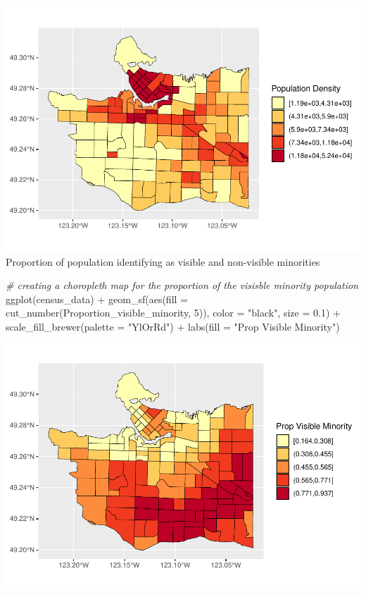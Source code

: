 \documentclass[
]{article}
\newenvironment{Shaded}{\begin{snugshade}}{\end{snugshade}}
\newcommand{\AttributeTok}[1]{\textcolor[rgb]{0.77,0.63,0.00}{#1}}
\newcommand{\CommentTok}[1]{\textcolor[rgb]{0.56,0.35,0.01}{\textit{#1}}}
\newcommand{\DecValTok}[1]{\textcolor[rgb]{0.00,0.00,0.81}{#1}}
\newcommand{\FloatTok}[1]{\textcolor[rgb]{0.00,0.00,0.81}{#1}}
\newcommand{\FunctionTok}[1]{\textcolor[rgb]{0.00,0.00,0.00}{#1}}
\newcommand{\NormalTok}[1]{#1}
\newcommand{\SpecialCharTok}[1]{\textcolor[rgb]{0.00,0.00,0.00}{#1}}
\newcommand{\StringTok}[1]{\textcolor[rgb]{0.31,0.60,0.02}{#1}}
\begin{document}
\includegraphics{4GA3Markdown_files/figure-latex/unnamed-chunk-23-1.pdf}
Proportion of population identifying as visible and non-visible
minorities

\begin{Shaded}
\begin{Highlighting}[]
\CommentTok{\# creating a choropleth map for the proportion of the visisble minority population}
\FunctionTok{ggplot}\NormalTok{(census\_data) }\SpecialCharTok{+}
\FunctionTok{geom\_sf}\NormalTok{(}\FunctionTok{aes}\NormalTok{(}\AttributeTok{fill =} \FunctionTok{cut\_number}\NormalTok{(Proportion\_visible\_minority, }\DecValTok{5}\NormalTok{)),}
        \AttributeTok{color =} \StringTok{"black"}\NormalTok{,}
        \AttributeTok{size =} \FloatTok{0.1}\NormalTok{) }\SpecialCharTok{+}
\FunctionTok{scale\_fill\_brewer}\NormalTok{(}\AttributeTok{palette =} \StringTok{"YlOrRd"}\NormalTok{) }\SpecialCharTok{+}
\FunctionTok{labs}\NormalTok{(}\AttributeTok{fill =} \StringTok{"Prop Visible Minority"}\NormalTok{)}
\end{Highlighting}
\end{Shaded}

\includegraphics{4GA3Markdown_files/figure-latex/unnamed-chunk-24-1.pdf}
\end{document}
